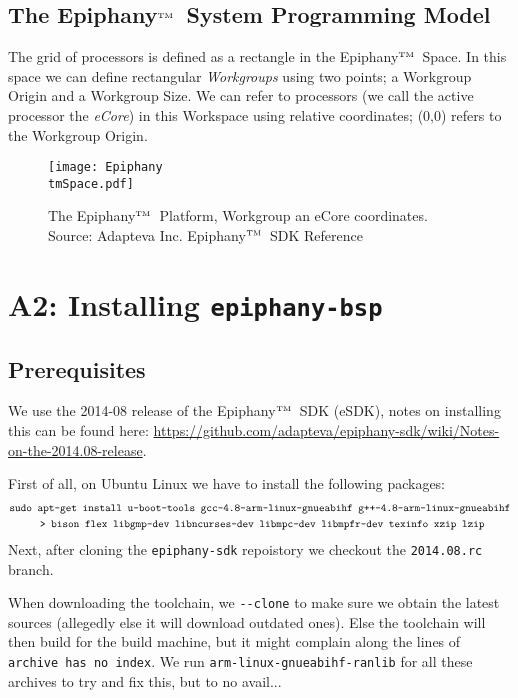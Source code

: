\documentclass[fleqn]{article}
\renewcommand{\(}{\left(}
\renewcommand{\)}{\right)}
\def\tm{$^{\hbox{\tiny TM}}$~}
\begin{document}
\subsection{The Epiphany\tm System Programming Model}
The grid of processors is defined as a rectangle in the Epiphany\tm Space. In this space we can define rectangular \textit{Workgroups} using two points; a Workgroup Origin and a Workgroup Size. We can refer to processors (we call the active processor the \textit{eCore}) in this Workspace using relative coordinates; (0,0) refers to the Workgroup Origin.

\begin{centering}
\begin{figure}
\centering
\texttt{[image: Epiphany\\tmSpace.pdf]}
\caption{The Epiphany\tm Platform, Workgroup an eCore coordinates. Source: Adapteva Inc. Epiphany\tm SDK Reference}
\end{figure}
\end{centering}

\section{A2: Installing \texttt{epiphany-bsp}}

\subsection{Prerequisites}

We use the 2014-08 release of the Epiphany\tm SDK (eSDK), notes on installing this can be found here: \url{https://github.com/adapteva/epiphany-sdk/wiki/Notes-on-the-2014.08-release}.

First of all, on Ubuntu Linux we have to install the following packages:
\begin{align*} 
    &\texttt{sudo apt-get install u-boot-tools gcc-4.8-arm-linux-gnueabihf g++-4.8-arm-linux-gnueabihf} \\
    &\texttt{\hspace{1 cm}> bison flex libgmp-dev libncurses-dev libmpc-dev libmpfr-dev texinfo xzip lzip}
\end{align*}
Next, after cloning the \verb+epiphany-sdk+ repoistory we checkout the \texttt{2014.08.rc} branch.

When downloading the toolchain, we \verb+--clone+ to make sure we obtain the latest sources (allegedly else it will download outdated ones). Else the toolchain will then build for the build machine, but it might complain along the lines of \texttt{archive has no index}. We run \texttt{arm-linux-gnueabihf-ranlib} for all these archives to try and fix this, but to no avail...
\end{document}
